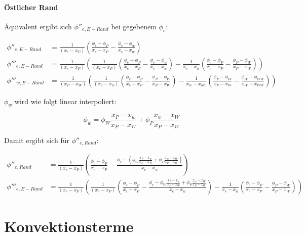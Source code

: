 \documentclass[10pt, ngerman,colorback,accentcolor=tud2d]{tudreport}
\begin{document}
\paragraph{Östlicher Rand}

Äquivalent ergibt sich $\phi''_{e, E-Rand}$ bei gegebenem $\phi_e$:

\begin{align*}
  \phi''_{e, E-Rand} &= \frac{1}{(x_e-x_P)}\left({
\frac{\phi_{e}-\phi_P}{x_{e}-x_P}-\frac{\phi_e-\phi_w}{x_e-x_w}}\right)
\\
  \phi'''_{e, E-Rand} &= \frac{1}{(x_e-x_P)} \left({
  \frac{1}{(x_e-x_P)} \left({
    \frac{\phi_e-\phi_P}{x_e-x_P} - \frac{\phi_e-\phi_w}{x_e-x_w}
    }\right) -
  \frac{1}{x_e-x_w} \left({
    \frac{\phi_e-\phi_P}{x_e-x_P} - \frac{\phi_P-\phi_W}{x_P-x_W}
    }\right)
  }\right)
  \\
  \phi'''_{w, E-Rand} &= \frac{1}{(x_P-x_W)} \left({
  \frac{1}{(x_e-x_w)} \left({
      \frac{\phi_e-\phi_P}{x_e-x_P} - \frac{\phi_P-\phi_W}{x_P-x_W}
    }\right) -
    \frac{1}{x_w-x_{ww}} \left({
        \frac{\phi_P-\phi_W}{x_P-x_W} - \frac{\phi_W-\phi_{WW}}{x_W-x_{WW}}
    }\right)
  }\right)
\end{align*}

$\phi_w$ wird wie folgt linear interpoliert:

\begin{equation*}
  \phi_w = \phi_W \frac{x_P-x_w}{x_P-x_W} + \phi_P \frac{x_w-x_W}{x_P-x_W}
\end{equation*}

Damit ergibt sich für $\phi''_{e,Rand}$:

\begin{align}
  \phi''_{e,Rand} &= \frac{1}{(x_e-x_P)}\left({
\frac{\phi_{e}-\phi_P}{x_{e}-x_P}-\frac{\phi_e-
  \left({
   \phi_W \frac{x_P-x_w}{x_P-x_W} + \phi_P \frac{x_w-x_W}{x_P-x_W}
  }\right)
}{x_e-x_w}}\right)
\\
  \phi'''_{e, E-Rand} &= \frac{1}{(x_e-x_P)} \left({
  \frac{1}{(x_e-x_P)} \left({
    \frac{\phi_e-\phi_P}{x_e-x_P} - \frac{\phi_e- \phi_W \frac{x_P-x_w}{x_P-x_W} + \phi_P \frac{x_w-x_W}{x_P-x_W}
}{x_e-x_w}
    }\right) -
  \frac{1}{x_e-x_w} \left({
    \frac{\phi_e-\phi_P}{x_e-x_P} - \frac{\phi_P-\phi_W}{x_P-x_W}
    }\right)
  }\right)
\end{align}



\section{Konvektionsterme}
\end{document}
